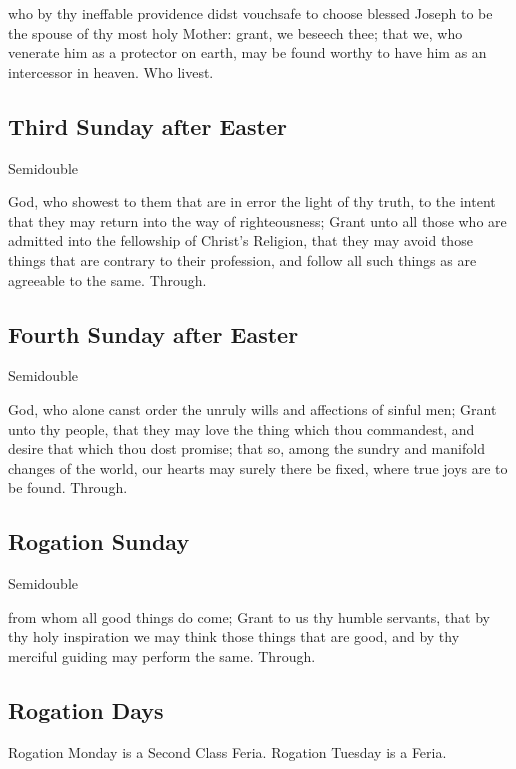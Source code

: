 \collect
{} who by thy ineffable providence didst vouchsafe to choose blessed Joseph to be the spouse of thy most holy Mother: grant, we beseech thee; that we, who venerate him as a protector on earth, may be found worthy to have him as an intercessor in heaven. Who livest.


\subsection{Third Sunday after Easter}
\begin{inhead}
    {Semidouble}
\end{inhead}

\collect
{} God, who showest to them that are in error the light of thy truth, to the intent that they may return into the way of righteousness; Grant unto all those who are admitted into the fellowship of Christ's Religion, that they may avoid those things that are contrary to their profession, and follow all such things as are agreeable to the same. Through.


\subsection{Fourth Sunday after Easter}
\begin{inhead}
    {Semidouble}
\end{inhead}

\collect
{} God, who alone canst order the unruly wills and affections of sinful men; Grant unto thy people, that they may love the thing which thou commandest, and desire that which thou dost promise; that so, among the sundry and manifold changes of the world, our hearts may surely there be fixed, where true joys are to be found. Through.


\subsection{Rogation Sunday}
\begin{inhead}
    {Semidouble}
\end{inhead}

\collect
{} from whom all good things do come; Grant to us thy humble servants, that by thy holy inspiration we may think those things that are good, and by thy merciful guiding may perform the same. Through.


\subsection{Rogation Days}
\begin{rubric}
	Rogation Monday is a Second Class Feria. Rogation Tuesday is a Feria.
\end{rubric}

